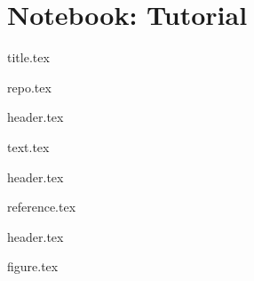 \documentclass[titlepage]{article}
\begin{document}
\part{Notebook: Tutorial}

{title.tex}

{repo.tex}
\newpage

{header.tex}

{text.tex}

{header.tex}

{reference.tex}

{header.tex}

\newpage

{figure.tex}
\end{document}

